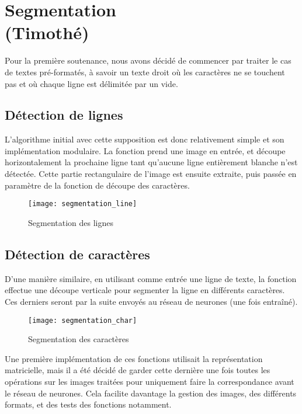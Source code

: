\chapter{Segmentation\\ (Timothé)}

Pour la première soutenance, nous avons décidé de commencer par traiter le cas
de textes pré-formatés, à savoir un texte droit où les caractères ne se
touchent pas et où chaque ligne est délimitée par un vide.

\section{Détection de lignes}

L'algorithme initial avec cette supposition est donc relativement simple et son
implémentation modulaire. La fonction prend une image en entrée, et découpe
horizontalement la prochaine ligne tant qu'aucune ligne entièrement blanche
n'est détectée. Cette partie rectangulaire de l'image est ensuite extraite, puis
passée en paramètre de la fonction de découpe des caractères.

\begin{figure}[H]
    \centering
    \texttt{[image: segmentation\_line]}
    \caption{Segmentation des lignes}
\end{figure}

\section{Détection de caractères}

D'une manière similaire, en utilisant comme entrée une ligne de texte, la
fonction effectue une découpe verticale pour segmenter la ligne en différents
caractères. Ces derniers seront par la suite envoyés au réseau de neurones (une
fois entraîné).

\begin{figure}[H]
    \centering
    \texttt{[image: segmentation\_char]}
    \caption{Segmentation des caractères}
\end{figure}

Une première implémentation de ces fonctions utilisait la représentation
matricielle, mais il a été décidé de garder cette dernière une fois toutes les
opérations sur les images traitées pour uniquement faire la correspondance avant
le réseau de neurones. Cela facilite davantage la gestion des images, des
différents formats, et des tests des fonctions notamment.
